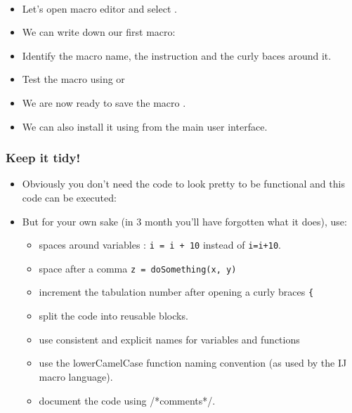 \begin{frame}[fragile]
  \begin{example}~\par
  \begin{itemize}
  \item Let's open macro editor and select .
  \item We can write down our first macro:\par
    
  \item Identify the macro name, the instruction and the curly baces around it.
  \item Test the macro using  or 
  \item We are now ready to save the macro .
  \item We can also install it using  from the main user interface.
  \end{itemize}
\end{example}
\end{frame}

\begin{frame}[fragile]
  \frametitle<presentation>{Keep it tidy!}
  \begin{itemize}
  \item Obviously you don't need the code to look pretty to be
    functional and this code can be executed:\par
    
  \item But for your own sake (in 3 month you'll have forgotten what it does), use:
    \begin{itemize}
    \item spaces around variables : \verb?i = i + 10? instead of \verb?i=i+10?.
    \item space after a comma \verb?z = doSomething(x, y)?
    \item increment the tabulation number after opening a curly braces \verb?{?
    \item split the code into reusable blocks.
    \item use consistent and explicit names for variables and functions
    \item use the lowerCamelCase function naming convention (as used by the IJ macro language).
    \item document the code using  \textcolor{green!50!black}{/*comments*/}.
    \end{itemize}
  \end{itemize}
\end{frame}

